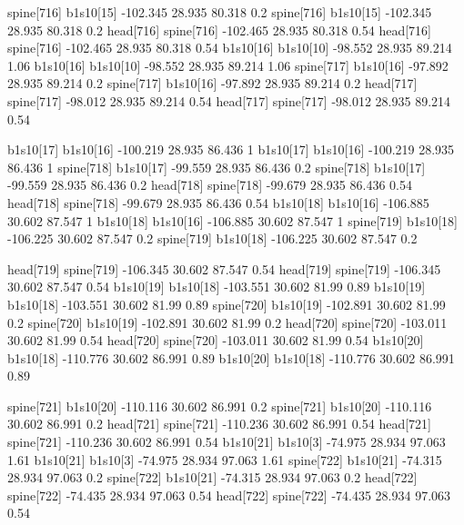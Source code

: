 spine[716]    b1s10[15]    -102.345    28.935    80.318    0.2
spine[716]    b1s10[15]    -102.345    28.935    80.318    0.2
head[716]    spine[716]    -102.465    28.935    80.318    0.54
head[716]    spine[716]    -102.465    28.935    80.318    0.54
b1s10[16]    b1s10[10]    -98.552    28.935    89.214    1.06
b1s10[16]    b1s10[10]    -98.552    28.935    89.214    1.06
spine[717]    b1s10[16]    -97.892    28.935    89.214    0.2
spine[717]    b1s10[16]    -97.892    28.935    89.214    0.2
head[717]    spine[717]    -98.012    28.935    89.214    0.54
head[717]    spine[717]    -98.012    28.935    89.214    0.54


b1s10[17]    b1s10[16]    -100.219    28.935    86.436    1
b1s10[17]    b1s10[16]    -100.219    28.935    86.436    1
spine[718]    b1s10[17]    -99.559    28.935    86.436    0.2
spine[718]    b1s10[17]    -99.559    28.935    86.436    0.2
head[718]    spine[718]    -99.679    28.935    86.436    0.54
head[718]    spine[718]    -99.679    28.935    86.436    0.54
b1s10[18]    b1s10[16]    -106.885    30.602    87.547    1
b1s10[18]    b1s10[16]    -106.885    30.602    87.547    1
spine[719]    b1s10[18]    -106.225    30.602    87.547    0.2
spine[719]    b1s10[18]    -106.225    30.602    87.547    0.2


head[719]    spine[719]    -106.345    30.602    87.547    0.54
head[719]    spine[719]    -106.345    30.602    87.547    0.54
b1s10[19]    b1s10[18]    -103.551    30.602    81.99    0.89
b1s10[19]    b1s10[18]    -103.551    30.602    81.99    0.89
spine[720]    b1s10[19]    -102.891    30.602    81.99    0.2
spine[720]    b1s10[19]    -102.891    30.602    81.99    0.2
head[720]    spine[720]    -103.011    30.602    81.99    0.54
head[720]    spine[720]    -103.011    30.602    81.99    0.54
b1s10[20]    b1s10[18]    -110.776    30.602    86.991    0.89
b1s10[20]    b1s10[18]    -110.776    30.602    86.991    0.89


spine[721]    b1s10[20]    -110.116    30.602    86.991    0.2
spine[721]    b1s10[20]    -110.116    30.602    86.991    0.2
head[721]    spine[721]    -110.236    30.602    86.991    0.54
head[721]    spine[721]    -110.236    30.602    86.991    0.54
b1s10[21]    b1s10[3]    -74.975    28.934    97.063    1.61
b1s10[21]    b1s10[3]    -74.975    28.934    97.063    1.61
spine[722]    b1s10[21]    -74.315    28.934    97.063    0.2
spine[722]    b1s10[21]    -74.315    28.934    97.063    0.2
head[722]    spine[722]    -74.435    28.934    97.063    0.54
head[722]    spine[722]    -74.435    28.934    97.063    0.54



